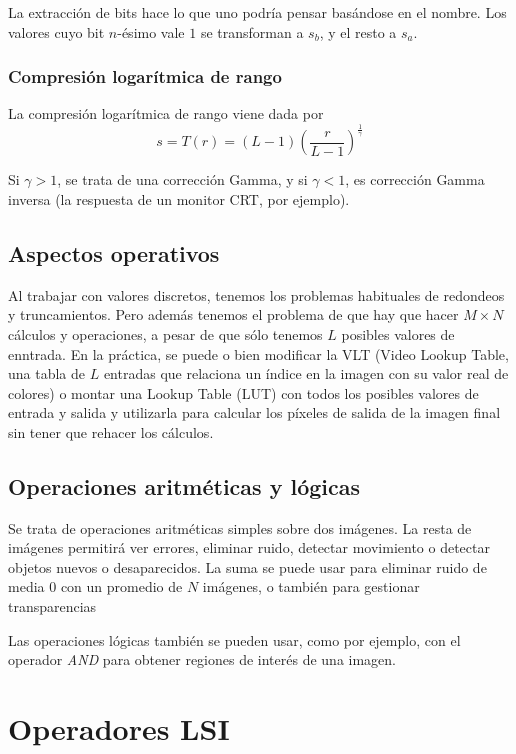 \documentclass[nochap,palatino]{apuntes}
\begin{document}
La extracción de bits hace lo que uno podría pensar basándose en el nombre. Los valores cuyo bit $n$-ésimo vale $1$ se transforman a $s_b$, y el resto a $s_a$.

\subsubsection{Compresión logarítmica de rango}

La compresión logarítmica de rango viene dada por \[ s = T(r) = (L - 1) \left(\frac{r}{L - 1}\right)^{\frac{1}{γ}} \]

Si $γ > 1$, se trata de una corrección Gamma, y si $γ < 1$, es corrección Gamma inversa (la respuesta de un monitor CRT, por ejemplo).

\subsection{Aspectos operativos}

Al trabajar con valores discretos, tenemos los problemas habituales de redondeos y truncamientos. Pero además tenemos el problema de que hay que hacer $M × N$ cálculos y operaciones, a pesar de que sólo tenemos $L$ posibles valores de enntrada. En la práctica, se puede o bien modificar la VLT (Video Lookup Table, una tabla de $L$ entradas que relaciona un índice en la imagen con su valor real de colores) o montar una Lookup Table (LUT) con todos los posibles valores de entrada y salida y utilizarla para calcular los píxeles de salida de la imagen final sin tener que rehacer los cálculos.

\subsection{Operaciones aritméticas y lógicas}

Se trata de operaciones aritméticas simples sobre dos imágenes. La resta de imágenes permitirá ver errores, eliminar ruido, detectar movimiento o detectar objetos nuevos o desaparecidos. La suma se puede usar para eliminar ruido de media 0 con un promedio de $N$ imágenes, o también para gestionar transparencias

Las operaciones lógicas también se pueden usar, como por ejemplo, con el operador \textit{AND} para obtener regiones de interés de una imagen.

\section{Operadores LSI}
\end{document}
